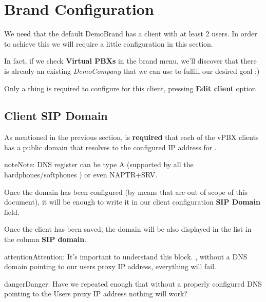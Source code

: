 \documentclass[letterpaper,10pt,english]{sphinxmanual}
\begin{document}
\section{Brand Configuration}
\label{getting_started/internal_calls/brand_portal::doc}\label{getting_started/internal_calls/brand_portal:brand-configuration}
We need that the default DemoBrand has a client with at least 2 users. In
order to achieve this we will require a little configuration in this section.

In fact, if we check \textbf{Virtual PBXs} in the brand menu, we'll discover that there
is already an existing \emph{DemoCompany} that we can use to fulfill our desired
goal :)

Only a thing is required to configure for this client, pressing \textbf{Edit client} option.


\subsection{Client SIP Domain}
\label{getting_started/internal_calls/brand_portal:domain-per-client}\label{getting_started/internal_calls/brand_portal:client-sip-domain}
As mentioned in the previous section, is \textbf{required} that each of the vPBX clients
has a public domain that resolves to the configured IP address for
{\hyperref[administration_portal/platform/infrastructure/proxy_users:proxyusers]{}}.

\begin{notice}{note}{Note:}
DNS register can be type A (supported by all the hardphones/softphones
) or even NAPTR+SRV.
\end{notice}

Once the domain has been configured (by means that are out of scope of this
document), it will be enough to write it in our client configuration \textbf{SIP Domain} field.

Once the client has been saved, the domain will be also displayed in the list in the column \textbf{SIP domain}.

\begin{notice}{attention}{Attention:}
It's important to understand this block. {\hyperref[getting_started/internal_calls/brand_portal:dnshack]{}}, without a DNS domain pointing to our
users proxy IP address, everything will fail.
\end{notice}

\begin{notice}{danger}{Danger:}
Have we repeated enough that without a properly configured DNS
pointing to the Users proxy IP address nothing will work?
\end{notice}
\end{document}
